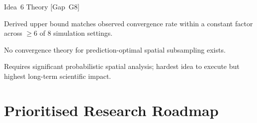 \documentclass[12pt, a4paper]{article}
\newcommand{\novelty}[1]{\textbf{Novelty:} #1/5}
\newcommand{\feasibility}[1]{\textbf{Feasibility:} #1/5}
\begin{document}
\begin{ideabox}{Idea~6 \textbullet{} Theory [Gap~G8]}
\begin{description}[leftmargin=5em, labelwidth=4.5em]
  \item[\textbf{Success criterion}]
    Derived upper bound matches observed convergence rate within a constant factor
    across $\geq 6$ of 8 simulation settings.

  \item[\novelty{5}]
    No convergence theory for prediction-optimal spatial subsampling exists.

  \item[\feasibility{2}]
    Requires significant probabilistic spatial analysis; hardest idea to execute
    but highest long-term scientific impact.
\end{description}

\end{ideabox}

\section{Prioritised Research Roadmap}
\end{document}
